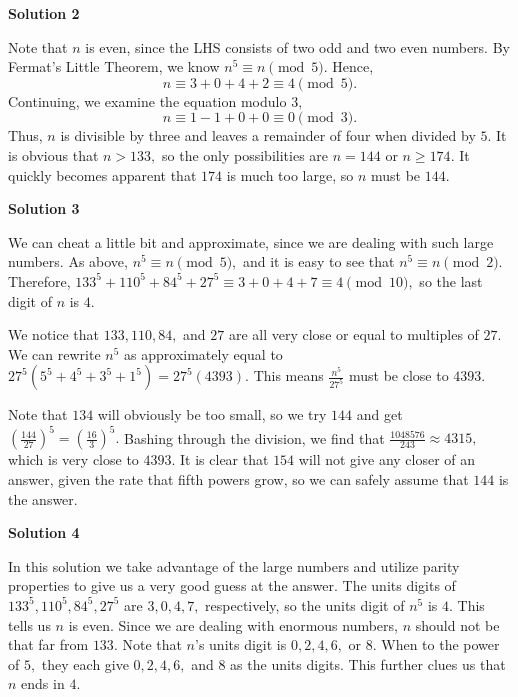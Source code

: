 \begin{enumerate}
\textbf{Solution 2}

Note that $n$ is even, since the LHS consists of two odd and two even numbers. By Fermat's Little Theorem, we know $n^5\equiv n\pmod{5}.$ Hence, 
 \[n\equiv3+0+4+2\equiv4\pmod{5}.\]Continuing, we examine the equation modulo $3,$ 
 \[n\equiv1-1+0+0\equiv0\pmod{3}.\]Thus, $n$ is divisible by three and leaves a remainder of four when divided by $5.$ It is obvious that $n>133,$ so the only possibilities are $n = 144$ or $n \geq 174.$ It quickly becomes apparent that $174$ is much too large, so $n$ must be $\boxed{144}.$




\textbf{Solution 3}

We can cheat a little bit and approximate, since we are dealing with such large numbers. As above, $n^5\equiv n\pmod{5},$ and it is easy to see that $n^5\equiv n\pmod 2.$ Therefore, $133^5+110^5+84^5+27^5\equiv 3+0+4+7\equiv 4\pmod{10},$ so the last digit of $n$ is $4.$

 We notice that $133,110,84,$ and $27$ are all very close or equal to multiples of $27.$ We can rewrite $n^5$ as approximately equal to $27^5(5^5+4^5+3^5+1^5) = 27^5(4393).$ This means $\frac{n^5}{27^5}$ must be close to $4393.$

 Note that $134$ will obviously be too small, so we try $144$ and get $\left(\frac{144}{27}\right)^5=\left(\frac{16}{3}\right)^5.$ Bashing through the division, we find that $\frac{1048576}{243}\approx 4315,$ which is very close to $4393.$ It is clear that $154$ will not give any closer of an answer, given the rate that fifth powers grow, so we can safely assume that $\boxed{144}$ is the answer.

 



\textbf{Solution 4}

In this solution we take advantage of the large numbers and utilize parity properties to give us a very good guess at the answer. The units digits of $133^5, 110^5, 84^5, 27^5$ are $3, 0, 4, 7,$ respectively, so the units digit of $n^5$ is $4.$ This tells us $n$ is even. Since we are dealing with enormous numbers, $n$ should not be that far from $133.$ Note that $n$'s units digit is $0, 2, 4, 6,$ or $8.$ When to the power of $5,$ they each give $0, 2, 4, 6,$ and $8$ as the units digits. This further clues us that $n$ ends in $4.$ 


\end{enumerate}
